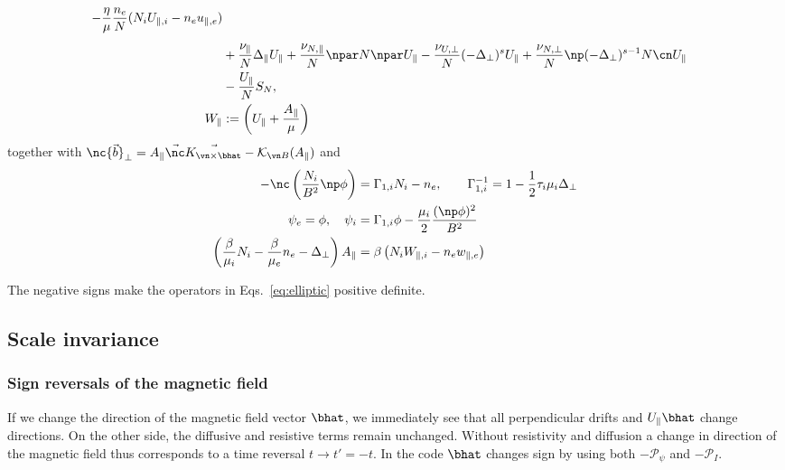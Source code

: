 \begin{subequations}
\begin{align}
        - \frac{\eta}{\mu} \frac{n_e}{N}(N_iU_{\parallel,i} - n_eu_{\parallel,e})
\nonumber \\&
\vphantom{\frac{\vec b\times\vn \psi}{B}} %
        + \frac{\nu_\parallel}{N} \Delta_\parallel U_\parallel
        + \frac{\nu_{N,\parallel}}{N} \npar N \npar U_\parallel
        - \frac{\nu_{U,\perp}}{N}(-\Delta_\perp)^{s} U_\parallel
        + \frac{\nu_{N,\perp}}{N} \np (-\Delta_\perp)^{s-1} N \cn U_\parallel
\nonumber \\&
    - \frac{U_\parallel}{N} S_N
    ,
        \label{eq:EgyrofluidU} \\
        W_\parallel&:= \left( U_\parallel + \frac{A_\parallel}{\mu}\right)
    \end{align}
    \label{eq:Egyrofluid}
\end{subequations}
together with
$\nc { \vec b}_\perp = A_\parallel \vec \nc\vec{ { K}_{\vn\times\bhat}} - \mathcal K_{\vn B}(A_\parallel) $
and
\begin{subequations} \label{eq:elliptic}
  \begin{align}
    -\nc\left( \frac{N_i}{B^2}\np \phi \right) &= \Gamma_{1,i} N_i - n_e, \quad\quad
    \Gamma_{1,i}^{-1} = 1-\frac{1}{2}\tau_i\mu_i \Delta_\perp \\
    \psi_e = \phi, \quad \psi_i &= \Gamma_{1,i}\phi -\frac{\mu_i}{2}\frac{(\np\phi)^2}{B^2} \\
    \left(\frac{\beta}{\mu_i}N_i - \frac{\beta}{\mu_e}n_e-\Delta_\perp\right)
    A_\parallel &= \beta\left(N_iW_{\parallel,i}-n_e w_{\parallel,e}\right)
  \end{align}
\end{subequations}
\begin{tcolorbox}[title=Note]
The negative signs make the operators in Eqs.~\eqref{eq:elliptic} positive definite.
\end{tcolorbox}

\subsection{Scale invariance}
\subsubsection{Sign reversals of the magnetic field}\label{sec:field_reversal}
If we change the direction of the magnetic field vector $\bhat$, we immediately see that all perpendicular
drifts and $U_\parallel\bhat$ change directions. On the other side, the diffusive and resistive terms remain unchanged.
Without resistivity and diffusion a change in direction of the magnetic field thus corresponds to
a time reversal $t\rightarrow t'=-t$.
In the code $\bhat$ changes sign by using both $-\mathcal P_\psi$ and $-\mathcal P_I$.

